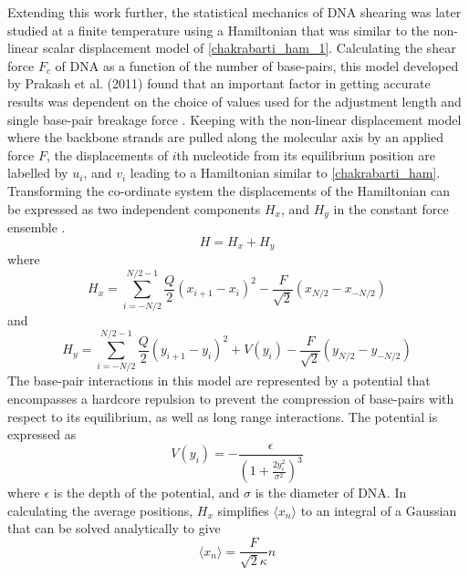 Extending this work further, the statistical mechanics of DNA shearing was later studied at a finite temperature using a Hamiltonian that was similar to the non-linear scalar displacement model of \eqref{chakrabarti_ham_1}. Calculating the shear force $F_{c}$ of DNA as a function of the number of base-pairs, this model developed by Prakash et al. (2011) found that an important factor in getting accurate results was dependent on the choice of values used for the adjustment length and single base-pair breakage force \cite{Prakash2011}. Keeping with the non-linear displacement model where the backbone strands are pulled along the molecular axis by an applied force $F$, the displacements of $i$th nucleotide from its equilibrium position are labelled by $u_{i}$, and $v_{i}$ leading to a Hamiltonian similar to \eqref{chakrabarti_ham}. Transforming the co-ordinate system the displacements of the Hamiltonian can be expressed as two independent components $H_{x}$, and $H_{y}$ in the constant force ensemble \cite{Prakash2011}.
%
\begin{equation}
H=H_{x}+H_{y}
\end{equation}
%
where
%
\begin{equation}
H_{x}=\sum^{N/2-1}_{i=-N/2}\frac{Q}{2}\left(x_{i+1}-x_{i}\right)^{2} - \frac{F}{\sqrt{2}}\left(x_{N/2}-x_{-N/2}\right)
\end{equation}
%
and
%
\begin{equation}
H_{y}=\sum^{N/2-1}_{i=-N/2}\frac{Q}{2}\left(y_{i+1}-y_{i}\right)^{2} + V\left(y_{i}\right) - \frac{F}{\sqrt{2}}\left(y_{N/2}-y_{-N/2}\right)
\end{equation}
%
The base-pair interactions in this model are represented by a potential that encompasses a hardcore repulsion to prevent the compression of base-pairs with respect to its equilibrium, as well as long range interactions. The potential is expressed as
%
\begin{equation}
\label{pe_shikha}
V\left(y_{i}\right)=-\frac{\epsilon}{\left(1+\frac{2y^{2}_{i}}{\sigma^{2}}\right)^{3}}
\end{equation}
% 
where $\epsilon$ is the depth of the potential, and $\sigma$ is the diameter of DNA. In calculating the average positions, $H_{x}$ simplifies $\langle x_{n}\rangle$ to an integral of a Gaussian that can be solved analytically to give 
%
\begin{equation}
\langle x_{n}\rangle = \frac{F}{\sqrt{2}\kappa}n
\end{equation}
%
